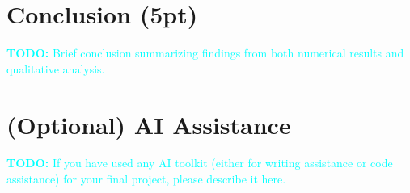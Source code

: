 \documentclass[twocolumn]{article}
\newcommand{\todo}[1]{\textcolor{cyan}{\textbf{TODO:} #1}}
\begin{document}


\section{Conclusion (5pt)}
\todo{Brief conclusion summarizing findings from both numerical results and
qualitative analysis.}

\section*{(Optional) AI Assistance}

\todo{If you have used any AI toolkit (either for writing assistance or code
assistance) for your final project, please describe it here. }

{}

\end{document}
